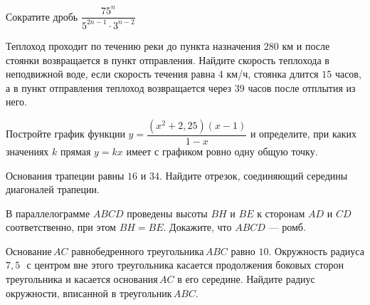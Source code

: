 \begin{training}[1]
\begin{listofex}[resume]
		\item Сократите дробь \( \dfrac{75^n}{5^{2n-1}\cdot3^{n-2}} \)
		\item Теплоход проходит по течению реки до пункта назначения \( 280 \) км и после стоянки возвращается в пункт отправления. Найдите скорость теплохода в неподвижной воде, если скорость течения равна \( 4 \) км/ч, стоянка длится \( 15 \) часов, а в пункт отправления теплоход возвращается через \( 39 \) часов после отплытия из него.
		\item Постройте график функции \( y=\dfrac{(x^2+2,25)(x-1)}{1-x} \) и определите, при каких значениях \( k \) прямая \( y=kx \) имеет с графиком ровно одну общую точку.
		\item Основания трапеции равны \( 16 \) и \( 34 \). Найдите отрезок, соединяющий середины диагоналей трапеции.
		\item В параллелограмме \( ABCD \) проведены высоты \( BH \) и \( BE \) к сторонам \( AD \) и \( CD \) соответственно, при этом \( BH=BE \). Докажите, что \( ABCD \) --- ромб.
		\item Основание \( AC \) равнобедренного треугольника \( ABC \) равно \( 10 \). Окружность радиуса \( 7,5 \) \( \, \) с центром вне этого треугольника касается продолжения боковых сторон треугольника и касается основания \( AC \) в его середине. Найдите радиус окружности, вписанной в треугольник \( ABC \).
	\end{listofex}
\end{training}

